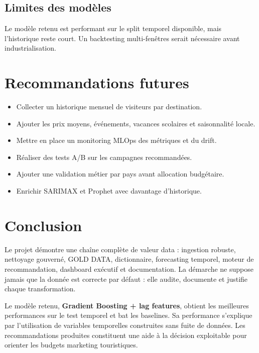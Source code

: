 \documentclass[11pt,a4paper]{report}
\begin{document}
\section{Limites des modèles}

Le modèle retenu est performant sur le split temporel disponible, mais l'historique reste court. Un backtesting multi-fenêtres serait nécessaire avant industrialisation.

\chapter{Recommandations futures}

\begin{itemize}[leftmargin=*]
    \item Collecter un historique mensuel de visiteurs par destination.
    \item Ajouter les prix moyens, événements, vacances scolaires et saisonnalité locale.
    \item Mettre en place un monitoring MLOps des métriques et du drift.
    \item Réaliser des tests A/B sur les campagnes recommandées.
    \item Ajouter une validation métier par pays avant allocation budgétaire.
    \item Enrichir SARIMAX et Prophet avec davantage d'historique.
\end{itemize}

\chapter*{Conclusion}

Le projet démontre une chaîne complète de valeur data : ingestion robuste, nettoyage gouverné, GOLD DATA, dictionnaire, forecasting temporel, moteur de recommandation, dashboard exécutif et documentation. La démarche ne suppose jamais que la donnée est correcte par défaut : elle audite, documente et justifie chaque transformation.

Le modèle retenu, \textbf{Gradient Boosting + lag features}, obtient les meilleures performances sur le test temporel et bat les baselines. Sa performance s'explique par l'utilisation de variables temporelles construites sans fuite de données. Les recommandations produites constituent une aide à la décision exploitable pour orienter les budgets marketing touristiques.

\appendix
\end{document}
